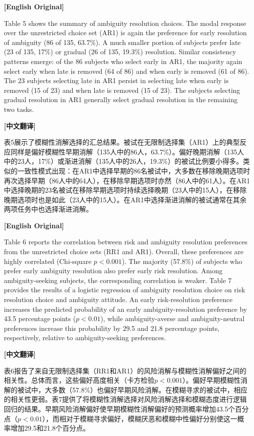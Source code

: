 \documentclass[12pt,a4paper]{ctexart}
\newenvironment{original}{%
  \par\medskip\noindent\textbf{[English Original]}\par\smallskip
  \color{black}\small
}{%
  \par\medskip
}
\newenvironment{translation}{%
  \par\noindent\textbf{[中文翻译]}\par\smallskip
  \color{blue}\small
}{%
  \par\bigskip
}
\theoremstyle{definition}
\theoremstyle{remark}
\begin{document}
\begin{original}
Table 5 shows the summary of ambiguity resolution choices. The modal response over the unrestricted choice set (AR1) is again the preference for early resolution of ambiguity (86 of 135, 63.7\%). A much smaller portion of subjects prefer late (23 of 135, 17\%) or gradual (26 of 135, 19.3\%) resolution. Similar consistency patterns emerge: of the 86 subjects who select early in AR1, the majority again select early when late is removed (64 of 86) and when early is removed (61 of 86). The 23 subjects selecting late in AR1 persist in selecting late when early is removed (15 of 23) and when late is removed (15 of 23). The subjects selecting gradual resolution in AR1 generally select gradual resolution in the remaining two tasks.
\end{original}
\begin{translation}
表5展示了模糊性消解选择的汇总结果。被试在无限制选择集（AR1）上的典型反应同样是偏好模糊性早期消解（135人中的86人，63.7\%）。偏好晚期消解（135人中的23人，17\%）或渐进消解（135人中的26人，19.3\%）的被试比例要小得多。类似的一致性模式出现：在AR1中选择早期的86名被试中，大多数在移除晚期选项时再次选择早期（86人中的64人），在移除早期选项时亦然（86人中的61人）。在AR1中选择晚期的23名被试在移除早期选项时持续选择晚期（23人中的15人），在移除晚期选项时也是如此（23人中的15人）。在AR1中选择渐进消解的被试通常在其余两项任务中也选择渐进消解。
\end{translation}

\begin{original}
Table 6 reports the correlation between risk and ambiguity resolution preferences from the unrestricted choice sets (RR1 and AR1). Overall, these preferences are highly correlated (Chi-square $p < 0.001$). The majority (57.8\%) of subjects who prefer early ambiguity resolution also prefer early risk resolution. Among ambiguity-seeking subjects, the corresponding correlation is weaker. Table 7 provides the results of a logistic regression of ambiguity resolution choice on risk resolution choice and ambiguity attitude. An early risk-resolution preference increases the predicted probability of an early ambiguity-resolution preference by 43.5 percentage points ($p < 0.01$), while ambiguity-averse and ambiguity-neutral preferences increase this probability by 29.5 and 21.8 percentage points, respectively, relative to ambiguity-seeking preferences.
\end{original}
\begin{translation}
表6报告了来自无限制选择集（RR1和AR1）的风险消解与模糊性消解偏好之间的相关性。总体而言，这些偏好高度相关（卡方检验$p < 0.001$）。偏好早期模糊性消解的被试中，大多数（57.8\%）也偏好早期风险消解。在模糊寻求的被试中，相应的相关性更弱。表7提供了将模糊性消解选择对风险消解选择和模糊态度进行逻辑回归的结果。早期风险消解偏好使早期模糊性消解偏好的预测概率增加43.5个百分点（$p < 0.01$），而相对于模糊寻求偏好，模糊厌恶和模糊中性偏好分别使这一概率增加29.5和21.8个百分点。
\end{translation}
\end{document}
